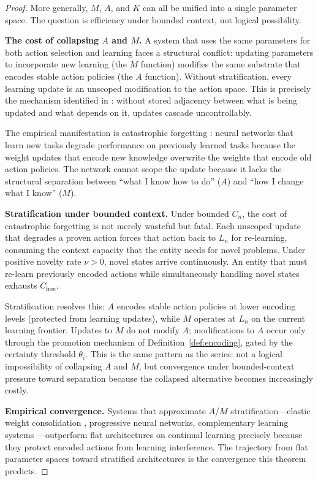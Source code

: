 \documentclass[11pt]{article}
\theoremstyle{definition}
\theoremstyle{remark}
\begin{document}
\begin{proof}
More generally, $M$, $A$, and $K$ can all be unified into a single
parameter space. The question is efficiency under bounded context,
not logical possibility.

\textbf{The cost of collapsing $A$ and $M$.}
A system that uses the same parameters for both action selection and
learning faces a structural conflict: updating parameters to
incorporate new learning (the $M$ function) modifies the same
substrate that encodes stable action policies (the $A$ function).
Without stratification, every learning update is an unscoped
modification to the action space. This is precisely the mechanism
identified in \cite{McCarthy2026a}: without stored adjacency between
what is being updated and what depends on it, updates cascade
uncontrollably.

The empirical manifestation is catastrophic forgetting
\cite{Kirkpatrick2017}: neural networks that learn new tasks degrade
performance on previously learned tasks because the weight updates
that encode new knowledge overwrite the weights that encode old
action policies. The network cannot scope the update because it lacks
the structural separation between ``what I know how to do'' ($A$)
and ``how I change what I know'' ($M$).

\textbf{Stratification under bounded context.}
Under bounded $C_n$, the cost of catastrophic forgetting is not merely
wasteful but fatal. Each unscoped update that degrades a proven action
forces that action back to $L_n$ for re-learning, consuming the
context capacity that the entity needs for novel problems. Under
positive novelty rate $\nu > 0$, novel states arrive continuously.
An entity that must re-learn previously encoded actions while
simultaneously handling novel states exhausts $C_{\mathrm{free}}$.

Stratification resolves this: $A$ encodes stable action policies at
lower encoding levels (protected from learning updates), while $M$
operates at $L_n$ on the current learning frontier. Updates to $M$
do not modify $A$; modifications to $A$ occur only through the
promotion mechanism of Definition~\ref{def:encoding}, gated by the
certainty threshold $\theta_i$. This is the same pattern as the
series: not a logical impossibility of collapsing $A$ and $M$, but
convergence under bounded-context pressure toward separation because
the collapsed alternative becomes increasingly costly.

\textbf{Empirical convergence.}
Systems that approximate $A$/$M$ stratification---elastic weight
consolidation \cite{Kirkpatrick2017}, progressive neural networks,
complementary learning systems \cite{McClelland1995}---outperform
flat architectures on continual learning precisely because they
protect encoded actions from learning interference. The trajectory
from flat parameter spaces toward stratified architectures is
the convergence this theorem predicts.
\end{proof}
\end{document}
